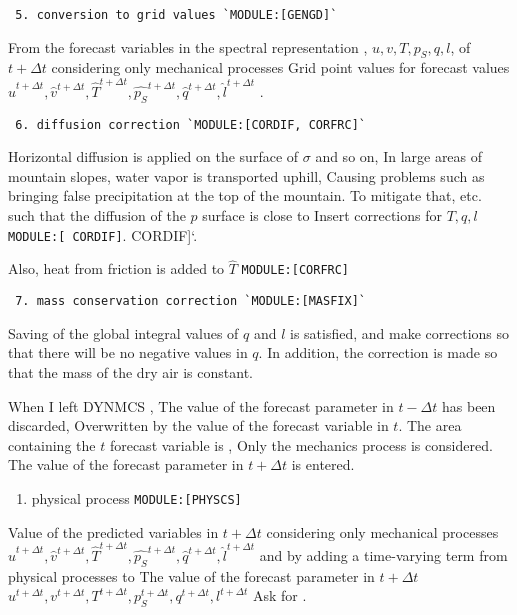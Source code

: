 \begin{verbatim}
 5. conversion to grid values `MODULE:[GENGD]`
\end{verbatim}

From the forecast variables in the spectral representation ,
\(u, v, T, p_S, q, l\), of \(t+\Delta t\) considering only mechanical
processes Grid point values for forecast values
\(\hat{u}^{t+\Delta t}, \hat{v}^{t+\Delta t}, \hat{T}^{t+\Delta t}, \hat{p_S}^{t+\Delta t}, \hat{q}^{t+\Delta t}, \hat{l}^{t+\Delta t}\)
.

\begin{verbatim}
 6. diffusion correction `MODULE:[CORDIF, CORFRC]`
\end{verbatim}

Horizontal diffusion is applied on the surface of \(\sigma\) and so on,
In large areas of mountain slopes, water vapor is transported uphill,
Causing problems such as bringing false precipitation at the top of the
mountain. To mitigate that, etc. such that the diffusion of the \(p\)
surface is close to Insert corrections for \(T,q,l\)
\texttt{MODULE:{[}\ CORDIF{]}}. CORDIF{]}`.

Also, heat from friction is added to \(\hat{T}\)
\texttt{MODULE:{[}CORFRC{]}}

\begin{verbatim}
 7. mass conservation correction `MODULE:[MASFIX]`
\end{verbatim}

Saving of the global integral values of \(q\) and \(l\) is satisfied,
and make corrections so that there will be no negative values in \(q\).
In addition, the correction is made so that the mass of the dry air is
constant.

When I left DYNMCS , The value of the forecast parameter in
\(t-\Delta t\) has been discarded, Overwritten by the value of the
forecast variable in \(t\). The area containing the \(t\) forecast
variable is , Only the mechanics process is considered. The value of the
forecast parameter in \(t+\Delta t\) is entered.

\begin{enumerate}
\def\labelenumi{\arabic{enumi}.}
\setcounter{enumi}{4}
\tightlist
\item
  physical process \texttt{MODULE:{[}PHYSCS{]}}
\end{enumerate}

Value of the predicted variables in \(t+\Delta t\) considering only
mechanical processes
\(\hat{u}^{t+\Delta t}, \hat{v}^{t+\Delta t}, \hat{T}^{t+\Delta t}, \hat{p_S}^{t+\Delta t}, \hat{q}^{t+\Delta t}, \hat{l}^{t+\Delta t}\)
and by adding a time-varying term from physical processes to The value
of the forecast parameter in \(t+\Delta t\)
\(u^{t+\Delta t}, v^{t+\Delta t}, T^{t+\Delta t}, p_S^{t+\Delta t}, q^{t+\Delta t}, l^{t+\Delta t}\)
Ask for .

